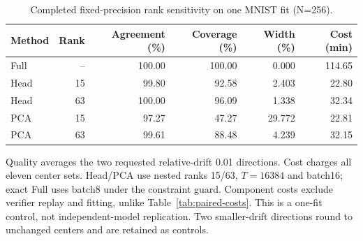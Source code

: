 \begin{table}[tp]
\centering
\small
\caption{Completed fixed-precision rank sensitivity on one MNIST fit (N=256).}\label{tab:controlled-rank}
\begin{tabular}{lrrrrr}
\toprule
Method & Rank & Agreement (\%) & Coverage (\%) & Width (\%) & Cost (min) \\
\midrule
Full & -- & 100.00 & 100.00 & 0.000 & 114.65 \\
Head & 15 & 99.80 & 92.58 & 2.403 & 22.80 \\
Head & 63 & 100.00 & 96.09 & 1.338 & 32.34 \\
PCA & 15 & 97.27 & 47.27 & 29.772 & 22.81 \\
PCA & 63 & 99.61 & 88.48 & 4.239 & 32.15 \\
\bottomrule
\end{tabular}
\par\smallskip\begin{minipage}{0.98\linewidth}\footnotesize Quality averages the two requested relative-drift 0.01 directions. Cost charges all eleven center sets. Head/PCA use nested ranks 15/63, $T=16384$ and batch16; exact Full uses batch8 under the constraint guard. Component costs exclude verifier replay and fitting, unlike Table~\ref{tab:paired-costs}. This is a one-fit control, not independent-model replication. Two smaller-drift directions round to unchanged centers and are retained as controls.\end{minipage}
\end{table}
